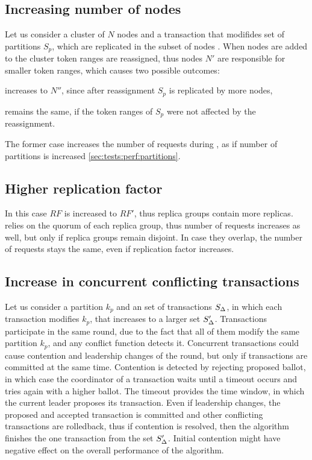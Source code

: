 \subsection{Increasing number of nodes}
Let us consider a cluster of $N$ nodes and a transaction that modifides set of partitions $S_{p}$, which are replicated in the subset of nodes \nodesTx.
When nodes are added to the cluster token ranges are reassigned, thus nodes $N'$ are responsible for smaller token ranges, which causes two possible outcomes:
\begin{enumerate*}[label=\alph*)]
\item \nodesTx increases to $N''$, since after reassignment $S_{p}$ is replicated by more nodes,
\item \nodesTx remains the same, if the token ranges of $S_{p}$ were not affected by the reassignment.
\end{enumerate*}

The former case increases the number of requests during \mpt, as if number of partitions is increased \ref{sec:tests:perf:partitions}.

\subsection{Higher replication factor}
In this case $RF$ is increased to $RF'$, thus replica groups contain more replicas. \mpt relies on the quorum of each replica group, thus number of requests increases as well, but only if replica groups remain disjoint. In case they overlap, the number of requests stays the same, even if replication factor increases.

\subsection{Increase in concurrent conflicting transactions}
Let us consider a partition $k_p$ and an set of transactions $S_{\text{$\Delta$}}$, in which each transaction modifies $k_p$, that increases to a larger set $S'_{\text{$\Delta$}}$. 
Transactions participate in the same \paxos round, due to the fact that all of them modify the same partition $k_p$, and any conflict function \label{sec:theory:conflictFunctions} detects it.
Concurrent transactions could cause contention and leadership changes of the \paxos round, but only if transactions are committed at the same time. Contention is detected by rejecting proposed ballot, in which case the coordinator of a transaction waits until a timeout occurs and tries again with a higher ballot. The timeout provides the time window, in which the current leader proposes its transaction. Even if leadership changes, the proposed and accepted transaction is committed and other conflicting transactions are rolledback, thus if contention is resolved, then the algorithm finishes the one transaction from the set $S'_{\text{$\Delta$}}$. Initial contention might have negative effect on the overall performance of the algorithm.

